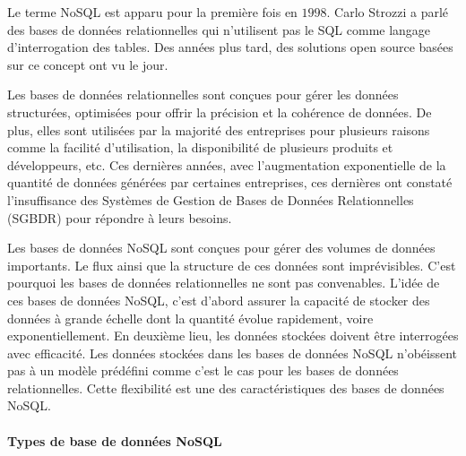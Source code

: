 	Le terme NoSQL est apparu pour la première fois en $ 1998 $. Carlo Strozzi \cite{CarloStrozziNosql} a parlé des bases de données relationnelles qui n'utilisent pas le SQL comme langage d'interrogation des tables. Des années plus tard, des solutions  open source basées sur ce concept ont vu le jour. 
	
	Les bases de données relationnelles sont conçues pour gérer les données structurées, optimisées pour offrir la précision et la cohérence de données. De plus, elles sont utilisées par la majorité des entreprises pour plusieurs raisons comme   la facilité d'utilisation, la disponibilité de plusieurs produits et développeurs, etc. Ces dernières années, avec l'augmentation exponentielle de la quantité de données générées par certaines entreprises, ces dernières ont constaté l'insuffisance des Systèmes de Gestion de Bases de Données Relationnelles (SGBDR) pour répondre à leurs besoins.
	
	Les bases de données NoSQL sont conçues pour gérer des  volumes de données importants. Le flux ainsi que la structure de  ces données sont imprévisibles. C'est pourquoi les bases de données relationnelles ne sont pas convenables. L'idée  de ces bases de données NoSQL, c'est d'abord assurer la capacité de stocker des données à grande échelle dont la  quantité  évolue rapidement, voire exponentiellement.  En deuxième lieu, les données stockées  doivent être interrogées  avec efficacité. Les données stockées dans  les bases de données NoSQL n'obéissent pas à un modèle prédéfini comme c'est le cas pour les bases de données relationnelles. Cette flexibilité est une des caractéristiques des bases de données NoSQL.
	\paragraph{Types de base de données NoSQL} \label{sec:nosql-database}  ~
	
